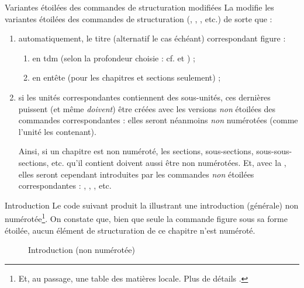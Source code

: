 \begin{dbremark}{Variantes étoilées des commandes de structuration modifiées}{}
  La \yatCl{} modifie les variantes étoilées des commandes de structuration
  (, ,
  , etc.) de sorte que :
  \begin{enumerate}
  \item automatiquement, le titre (alternatif le cas échéant) correspondant
    figure :
    \begin{enumerate}
    \item en \gls{tdm} (selon la profondeur choisie : cf.  et
      ) ;
    \item en entête (pour les chapitres et sections seulement) ;
    \end{enumerate}
  \item si les unités correspondantes contiennent des sous-unités, ces dernières
    puissent (et même \emph{doivent}) être créées avec les versions \emph{non}
    étoilées des commandes correspondantes : elles seront néanmoins \emph{non}
    numérotées (comme l'unité les contenant).

    Ainsi, si un chapitre est non numéroté, les sections, sous-sections,
    sous-sous-sections, etc. qu'il contient doivent aussi être non
    numérotées. Et, avec la \yatCl{}, elles seront cependant introduites par les
    commandes \emph{non} étoilées correspondantes : ,
    , , etc.
  \end{enumerate}
\end{dbremark}

\begin{dbexample}{Introduction}{}
  Le code suivant produit la  illustrant une introduction
  (générale) non numérotée\footnote{Et, au passage, une table des matières
    locale. Plus de détails .}. On constate que, bien que
  seule la commande  figure sous sa forme étoilée, aucun
  élément de structuration de ce chapitre n'est numéroté.
\end{dbexample}

\begin{figure}[p]
  \centering
  \caption{Introduction (non numérotée)}
  \label{fig-introduction}
\end{figure}

